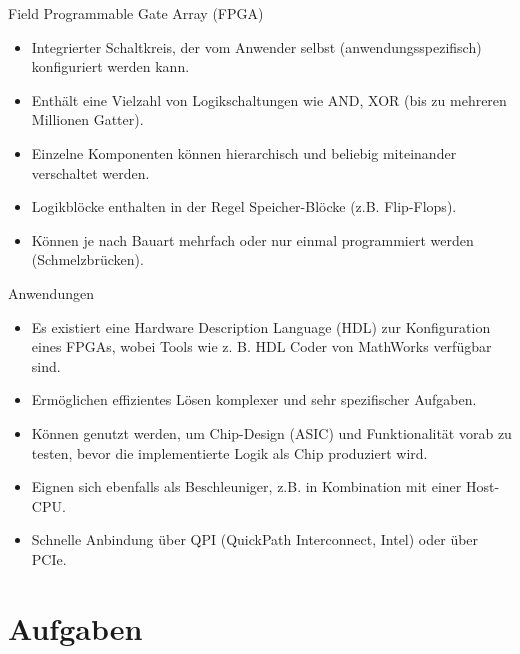 \begin{defi}{Field Programmable Gate Array (FPGA)}
    \begin{itemize}
        \item Integrierter Schaltkreis, der vom Anwender selbst (anwendungsspezifisch) konfiguriert werden kann.
        \item Enthält eine Vielzahl von Logikschaltungen wie AND, XOR (bis zu mehreren Millionen Gatter).
        \item Einzelne Komponenten können hierarchisch und beliebig miteinander verschaltet werden.
        \item Logikblöcke enthalten in der Regel Speicher-Blöcke (z.B. Flip-Flops).
        \item Können je nach Bauart mehrfach oder nur einmal programmiert werden (Schmelzbrücken).
    \end{itemize}
\end{defi}

\begin{defi}{Anwendungen}
    \begin{itemize}
        \item Es existiert eine Hardware Description Language (HDL) zur Konfiguration eines FPGAs, wobei Tools wie z. B. HDL Coder von MathWorks verfügbar sind.
        \item Ermöglichen effizientes Lösen komplexer und sehr spezifischer Aufgaben.
        \item Können genutzt werden, um Chip-Design (ASIC) und Funktionalität vorab zu testen, bevor die implementierte Logik als Chip produziert wird.
        \item Eignen sich ebenfalls als Beschleuniger, z.B. in Kombination mit einer Host-CPU.
        \item Schnelle Anbindung über QPI (QuickPath Interconnect, Intel) oder über PCIe.
    \end{itemize}
\end{defi}

\section{Aufgaben}
